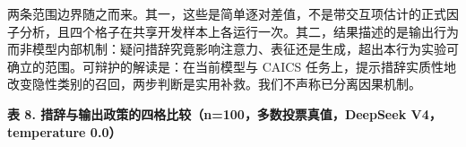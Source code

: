 \documentclass[11pt]{article}
\begin{document}
{\cjkfont 两\allowbreak 条\allowbreak 范\allowbreak 围\allowbreak 边\allowbreak 界\allowbreak 随\allowbreak 之\allowbreak 而\allowbreak 来\allowbreak 。\allowbreak 其\allowbreak 一\allowbreak ，\allowbreak 这\allowbreak 些\allowbreak 是\allowbreak 简\allowbreak 单\allowbreak 逐\allowbreak 对\allowbreak 差\allowbreak 值\allowbreak ，\allowbreak 不\allowbreak 是\allowbreak 带\allowbreak 交\allowbreak 互\allowbreak 项\allowbreak 估\allowbreak 计\allowbreak 的\allowbreak 正\allowbreak 式\allowbreak 因\allowbreak 子\allowbreak 分\allowbreak 析\allowbreak ，\allowbreak 且\allowbreak 四\allowbreak 个\allowbreak 格\allowbreak 子\allowbreak 在\allowbreak 共\allowbreak 享\allowbreak 开\allowbreak 发\allowbreak 样\allowbreak 本\allowbreak 上\allowbreak 各\allowbreak 运\allowbreak 行\allowbreak 一\allowbreak 次\allowbreak 。\allowbreak 其\allowbreak 二\allowbreak ，\allowbreak 结\allowbreak 果\allowbreak 描\allowbreak 述\allowbreak 的\allowbreak 是\allowbreak 输\allowbreak 出\allowbreak 行\allowbreak 为\allowbreak 而\allowbreak 非\allowbreak 模\allowbreak 型\allowbreak 内\allowbreak 部\allowbreak 机\allowbreak 制\allowbreak ：\allowbreak 疑\allowbreak 问\allowbreak 措\allowbreak 辞\allowbreak 究\allowbreak 竟\allowbreak 影\allowbreak 响\allowbreak 注\allowbreak 意\allowbreak 力\allowbreak 、\allowbreak 表\allowbreak 征\allowbreak 还\allowbreak 是\allowbreak 生\allowbreak 成\allowbreak ，\allowbreak 超\allowbreak 出\allowbreak 本\allowbreak 行\allowbreak 为\allowbreak 实\allowbreak 验\allowbreak 可\allowbreak 确\allowbreak 立\allowbreak 的\allowbreak 范\allowbreak 围\allowbreak 。\allowbreak 可\allowbreak 辩\allowbreak 护\allowbreak 的\allowbreak 解\allowbreak 读\allowbreak 是\allowbreak ：\allowbreak 在\allowbreak 当\allowbreak 前\allowbreak 模\allowbreak 型\allowbreak 与} CAICS {\cjkfont 任\allowbreak 务\allowbreak 上\allowbreak ，\allowbreak 提\allowbreak 示\allowbreak 措\allowbreak 辞\allowbreak 实\allowbreak 质\allowbreak 性\allowbreak 地\allowbreak 改\allowbreak 变\allowbreak 隐\allowbreak 性\allowbreak 类\allowbreak 别\allowbreak 的\allowbreak 召\allowbreak 回\allowbreak ，\allowbreak 两\allowbreak 步\allowbreak 判\allowbreak 断\allowbreak 是\allowbreak 实\allowbreak 用\allowbreak 补\allowbreak 救\allowbreak 。\allowbreak 我\allowbreak 们\allowbreak 不\allowbreak 声\allowbreak 称\allowbreak 已\allowbreak 分\allowbreak 离\allowbreak 因\allowbreak 果\allowbreak 机\allowbreak 制\allowbreak 。}

\textbf{{\cjkfont 表} 8. {\cjkfont 措\allowbreak 辞\allowbreak 与\allowbreak 输\allowbreak 出\allowbreak 政\allowbreak 策\allowbreak 的\allowbreak 四\allowbreak 格\allowbreak 比\allowbreak 较\allowbreak （}n=100{\cjkfont ，\allowbreak 多\allowbreak 数\allowbreak 投\allowbreak 票\allowbreak 真\allowbreak 值\allowbreak ，}DeepSeek V4{\cjkfont ，}temperature 0.0{\cjkfont ）}}
\end{document}
